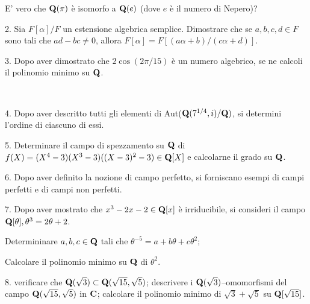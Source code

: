  

 E' vero che ${\bf Q}(\pi)$ \`e isomorfo a ${\bf Q}(e)$ (dove $e$ \`e il numero di Nepero)?

 \medskip
 




\item{2.} Sia $F[\alpha]/F$ un estensione algebrica semplice. Dimostrare che se $a,b,c,d\in F$ sono tali che $ad-bc\neq0$, allora $F[\alpha]=F[(a\alpha+b)/(c\alpha+d)].$\vv


\item{3.} Dopo aver dimostrato che $2\cos(2\pi/15)$ \`e un numero algebrico, se ne calcoli il polinomio minimo su ${\bf Q}$.


\ve\ \vs


\item{4.} Dopo aver descritto tutti gli elementi di Aut(${\bf Q}(7^{1/4},i)/{\bf Q})$, si determini l'ordine di ciascuno di essi.\vv

\item{5.} Determinare il campo di spezzamento su ${\bf Q}$ di $f(X)=(X^4-3)(X^3-3)((X-3)^2-3)\in{\bf Q}[X]$ e calcolarne il grado su ${\bf Q}$.
\ve\ \vs


\item{6.} Dopo aver definito la nozione di campo perfetto, si forniscano esempi di campi perfetti e di campi non perfetti.\vv\vv

\item{7.} Dopo aver mostrato che $x^3-2x-2\in{\bf Q}[x]$ \`e irriducibile,
si consideri il campo ${\bf Q}[\theta], \theta^3=2\theta+2$. 

 Determininare $a,b,c\in{\bf Q}$ tali che $\theta^{-5}=a+b\theta+c\theta^2;$ 

 Calcolare il polinomio minimo su ${\bf Q}$ di $\theta^2$. \vv\vv

\item{8.} 
 verificare che ${\bf Q}(\sqrt{3})\subset{\bf Q}(\sqrt{15},\sqrt5)$;  descrivere i ${\bf Q}(\sqrt{3})$--omomorfismi del campo 
${\bf Q}(\sqrt{15},\sqrt5)$ in ${\bf C}$;
 calcolare il polinomio minimo di $\sqrt{3}+\sqrt{5}$ su ${\bf Q}[\sqrt{15}]$.

\vv

\ \vst
 \bye
